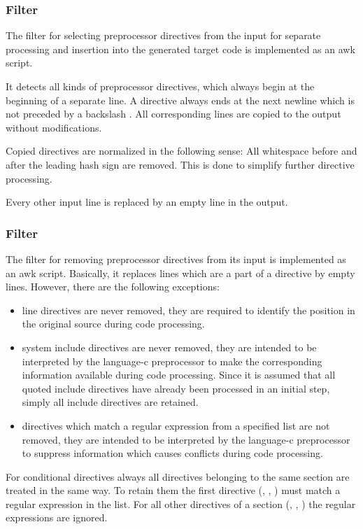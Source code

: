 \subsubsection{Filter }

The filter for selecting preprocessor directives from the input for separate processing and insertion into
the generated target code is implemented as an awk script.

It detects all kinds of preprocessor directives, which always begin at the beginning of a separate line.
A directive always ends at the next newline which is not preceded by a backslash \code{\\}. All corresponding
lines are copied to the output without modifications.

Copied directives are normalized in the following sense: All whitespace before and after the leading hash
sign are removed. This is done to simplify further directive processing.

Every other input line is replaced by an empty line in the output.

\subsubsection{Filter }

The filter for removing preprocessor directives from its input is implemented as an awk script.
Basically, it replaces lines which are a part of a directive by empty lines. However, there are the following
exceptions:
\begin{itemize}
\item line directives are never removed, they are required to identify the position in the original source
during code processing.
\item system include directives are never removed, they are intended to be interpreted by the language-c
preprocessor to make the corresponding information available during code processing. Since it is assumed that
all quoted include directives have already been processed in an initial step, simply all include
directives are retained.
\item directives which match a regular expression from a specified list are not removed, they are intended
to be interpreted by the language-c preprocessor to suppress information which causes conflicts during code
processing.
\end{itemize}

For conditional directives always all directives belonging to the same section are treated in the same way.
To retain them the first directive (, , ) must match a regular expression
in the list. For all other directives of a section (, , ) the 
regular expressions are ignored.

